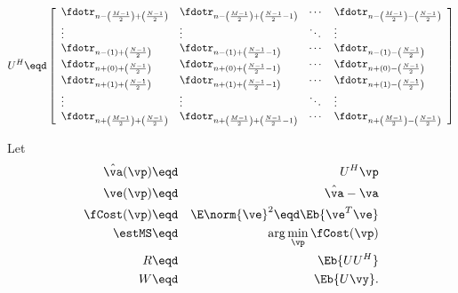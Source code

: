 \[
   U^H \eqd
   \left[\begin{array}{llll}
      \fdotr_{n-\left(\frac{M-1}{2}\right)+\left(\frac{N-1}{2}\right)}    & \fdotr_{n-\left(\frac{M-1}{2}\right)+\left(\frac{N-1}{2}-1\right)}  & \cdots & \fdotr_{n-\left(\frac{M-1}{2}\right)-\left(\frac{N-1}{2}\right)}  \\
      \vdots                                                                & \vdots                                                                & \ddots & \vdots                                                                \\
      \fdotr_{n-(1)+\left(\frac{N-1}{2}\right)}                           & \fdotr_{n-(1)+\left(\frac{N-1}{2}-1\right)}                         & \cdots & \fdotr_{n-(1)-\left(\frac{N-1}{2}\right)}                         \\
      \fdotr_{n+(0)+\left(\frac{N-1}{2}\right)}                           & \fdotr_{n+(0)+\left(\frac{N-1}{2}-1\right)}                         & \cdots & \fdotr_{n+(0)-\left(\frac{N-1}{2}\right)}                         \\
      \fdotr_{n+(1)+\left(\frac{N-1}{2}\right)}                           & \fdotr_{n+(1)+\left(\frac{N-1}{2}-1\right)}                         & \cdots & \fdotr_{n+(1)-\left(\frac{N-1}{2}\right)}                         \\
      \vdots                                                                & \vdots                                                                & \ddots & \vdots                                                                \\
      \fdotr_{n+\left(\frac{M-1}{2}\right)+\left(\frac{N-1}{2}\right)}    & \fdotr_{n+\left(\frac{M-1}{2}\right)+\left(\frac{N-1}{2}-1\right)}  & \cdots & \fdotr_{n+\left(\frac{M-1}{2}\right)-\left(\frac{N-1}{2}\right)} 
   \end{array}\right]
\]


Let
\begin{eqnarray*}
   \hat{\va}(\vp)   &\eqd& U^H\vp    \\
   \ve(\vp)    &\eqd& \hat{\va}-\va \\
   \fCost(\vp) &\eqd& \E\norm{\ve}^2 \eqd \Eb{\ve^T\ve} \\
   \estMS      &\eqd& \arg\min_\vp \fCost(\vp)  \\
   R           &\eqd& \Eb{UU^H} \\
   W           &\eqd& \Eb{ U\vy}.
\end{eqnarray*}

